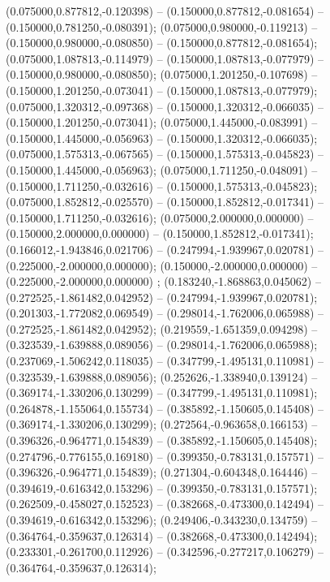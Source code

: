  (0.075000,0.877812,-0.120398) -- (0.150000,0.877812,-0.081654) -- (0.150000,0.781250,-0.080391);
 (0.075000,0.980000,-0.119213) -- (0.150000,0.980000,-0.080850) -- (0.150000,0.877812,-0.081654);
 (0.075000,1.087813,-0.114979) -- (0.150000,1.087813,-0.077979) -- (0.150000,0.980000,-0.080850);
 (0.075000,1.201250,-0.107698) -- (0.150000,1.201250,-0.073041) -- (0.150000,1.087813,-0.077979);
 (0.075000,1.320312,-0.097368) -- (0.150000,1.320312,-0.066035) -- (0.150000,1.201250,-0.073041);
 (0.075000,1.445000,-0.083991) -- (0.150000,1.445000,-0.056963) -- (0.150000,1.320312,-0.066035);
 (0.075000,1.575313,-0.067565) -- (0.150000,1.575313,-0.045823) -- (0.150000,1.445000,-0.056963);
 (0.075000,1.711250,-0.048091) -- (0.150000,1.711250,-0.032616) -- (0.150000,1.575313,-0.045823);
 (0.075000,1.852812,-0.025570) -- (0.150000,1.852812,-0.017341) -- (0.150000,1.711250,-0.032616);
 (0.075000,2.000000,0.000000) -- (0.150000,2.000000,0.000000) -- (0.150000,1.852812,-0.017341);
 (0.166012,-1.943846,0.021706) -- (0.247994,-1.939967,0.020781) -- (0.225000,-2.000000,0.000000);
 (0.150000,-2.000000,0.000000) -- (0.225000,-2.000000,0.000000) ;
 (0.183240,-1.868863,0.045062) -- (0.272525,-1.861482,0.042952) -- (0.247994,-1.939967,0.020781);
 (0.201303,-1.772082,0.069549) -- (0.298014,-1.762006,0.065988) -- (0.272525,-1.861482,0.042952);
 (0.219559,-1.651359,0.094298) -- (0.323539,-1.639888,0.089056) -- (0.298014,-1.762006,0.065988);
 (0.237069,-1.506242,0.118035) -- (0.347799,-1.495131,0.110981) -- (0.323539,-1.639888,0.089056);
 (0.252626,-1.338940,0.139124) -- (0.369174,-1.330206,0.130299) -- (0.347799,-1.495131,0.110981);
 (0.264878,-1.155064,0.155734) -- (0.385892,-1.150605,0.145408) -- (0.369174,-1.330206,0.130299);
 (0.272564,-0.963658,0.166153) -- (0.396326,-0.964771,0.154839) -- (0.385892,-1.150605,0.145408);
 (0.274796,-0.776155,0.169180) -- (0.399350,-0.783131,0.157571) -- (0.396326,-0.964771,0.154839);
 (0.271304,-0.604348,0.164446) -- (0.394619,-0.616342,0.153296) -- (0.399350,-0.783131,0.157571);
 (0.262509,-0.458027,0.152523) -- (0.382668,-0.473300,0.142494) -- (0.394619,-0.616342,0.153296);
 (0.249406,-0.343230,0.134759) -- (0.364764,-0.359637,0.126314) -- (0.382668,-0.473300,0.142494);
 (0.233301,-0.261700,0.112926) -- (0.342596,-0.277217,0.106279) -- (0.364764,-0.359637,0.126314);
